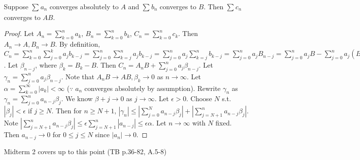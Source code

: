 \begin{thm}[50]
	Suppose $\sum_{}{a_{n}}$ converges absolutely to $A$ and $\sum_{}{b_{n}}$ converges to $B$. Then $\sum_{}{c_n}$ converges to $AB$.
	\begin{proof}
		Let $A_{n}=\sum_{k=0}^{n}{a_{k}}$, $B_{n}=\sum_{k=0}^{n}{b_{k}}$, $C_{n}=\sum_{k=0}^{n}{c_{k}}$.
		Then $A_{n} \to  A, B_{n}\to B$.
		By definition, $C_{n}=\sum_{k=0}^{n}{\sum_{j=0}^{k}{a_{j}b_{k-j}}}=\sum_{j=0}^{n}{\sum_{k=j}^{n}{a_j b_{k-j}}}=\sum_{j=0}^{n}{a_{j} \sum_{k=j}^{n}{b_{k-j}}}
			=\sum_{j=0}^{n}{a_{j}B_{n-j}}=\sum_{j=0}^{n}{a_{j}B}-\sum_{j=0}^{n}{a_{j}(B_{n-j}-B)}$. Let $\beta_{n-j}$, where $\beta_k=B_k -B$.
		Then $C_n=A_nB + \sum_{j=0}^{n}{a_{j}\beta_{n-j}}$. Let $\gamma_n=\sum_{j=0}^{n}{a_{j}\beta_{n-j}}$.
		Note that $A_nB \to AB, \beta_k \to 0$ as $n\to \infty$.
		Let $\alpha=\sum_{k=0}^{\infty}{|a_k|}<\infty $  ($\because$ $a_{n}$ converges absolutely by assumption). Rewrite $\gamma_n$ as $\gamma_n=\sum_{j=0}^{n}{a_{n-j} \beta_j}$. We know $\beta+j \to 0$ as $j\to \infty$.
		Let $\epsilon>0$. Choose $N$ s.t. $|\beta_j|<\epsilon$ if $j\ge N$.
		Then for $n\ge N+1$, $|\gamma_n|\le |\sum_{j=0}^{N}{a_{n-j}\beta_j}|+|\sum_{j=N+1}^{n}{a_{n-j}\beta_j}|$. Note $|\sum_{j=N+1}^{n}{a_{n-j}\beta_j}| \le \epsilon \sum_{j=N+1}^{n}{|a_{n-j}|}\le \epsilon \alpha$.
		Let $n\to \infty$ with $N$ fixed. Then $a_{n-j}\to 0$ for $0 \le j \le N$ since $|a_{n}|\to 0$.
	\end{proof}
\end{thm}

Midterm 2 covers up to this point (TB p.36-82, A.5-8)
